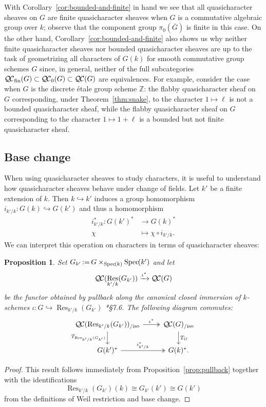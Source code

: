 \documentclass{amsart}
\theoremstyle{plain}
\newtheorem{proposition}[theorem]{Proposition}
\theoremstyle{definition}
\theoremstyle{remark}
\newcommand{\ZZ}{{\mathbb{Z}}}
\newcommand{\Fq}{k}
\DeclareMathOperator{\Res}{Res}
\newcommand{\Spec}[1]{{\operatorname{Spec}\hskip-1pt( #1 )}}
\newcommand{\ceq}{{\, :=\, }}
\newcommand{\QC}{{\mathcal{Q\hskip-0.8pt C}}}
\newcommand{\bQC}{{\QC_0}}
\newcommand{\fQC}{{\QC_\text{fin}}}
\newcommand{\QCiso}[1]{\QC(#1)_{/\text{iso}}}
\newcommand{\TrFrob}[1]{T_{#1}}
\begin{document}
With Corollary~\ref{cor:bounded-and-finite} in hand
we see that all quasicharacter sheaves on $G$ are finite quasicharacter sheaves
when $G$ is a commutative algebraic group over $\Fq$;
observe that the component group $\pi_0({\bar G})$ is finite in this case.
On the other hand, Corollary~\ref{cor:bounded-and-finite} also shows us
why neither finite quasicharacter sheaves nor bounded quasicharacter sheaves
are up to the task of geometrizing all characters of $G(\Fq)$ for smooth commutative group schemes $G$ since, in general, neither of the full subcategories
$\fQC(G) \subset \bQC(G) \subset \QC(G)$ are equivalences.
For example, consider the case when $G$ is the discrete \'etale group scheme $\ZZ$:
the flabby quasicharacter sheaf on $G$ corresponding, under Theorem~\ref{thm:snake},
to the character $1 \mapsto \ell$ is not a bounded quasicharacter sheaf,
while the flabby quasicharacter sheaf on $G$ corresponding
to the character $1 \mapsto 1+ \ell$ is a bounded but not finite quasicharacter sheaf.

\subsection{Base change}\label{sec:basechange}

When using quasicharacter sheaves to study characters, it is useful to understand
how quasicharacter sheaves behave under change of fields.
Let $k'$ be a finite extension of $k$. Then $k \hookrightarrow k'$ induces a group homomorphism
$i_{k'/k} : G(k) \hookrightarrow G(k')$ and thus a homomorphism
\begin{align*}
i_{k'/k}^* : G(k')^* &\to G(k)^* \\
\chi &\mapsto \chi\circ i_{k'/k}.
\end{align*}
We can interpret this operation on characters in terms of quasicharacter sheaves:

\begin{proposition} \label{prop:csbe}
Set $G_{k'} \ceq G\times_\Spec{k} \Spec{k'}$ and let
\[
\QC(\Res_{k'/k}(G_{k'})) \xrightarrow{\iota^*} \QC(G)
\]
be the functor obtained by pullback along the canonical closed immersion of $k$-schemes
$\iota : G \hookrightarrow \Res_{k'/k}(G_{k'})$
\cite{bosch-lutkebohmert-reynaud:NeronModels}*{\S 7.6}.
The following diagram commutes:
\[
\begin{tikzcd}
\QCiso{\Res_{k'/k}(G_{k'})} \arrow[two heads]{r}{\iota^*} \dar[swap]{\TrFrob{\Res_{k'/k}(G_{k'})}} & \QCiso{G} \dar{\TrFrob{G}} \\
G(k')^* \arrow[two heads]{r}{i_{k'/k}^*} & G(k)^*.
\end{tikzcd}
\]
\end{proposition}
\begin{proof}
This result follows immediately from Proposition~\ref{prop:pullback} together with the identifications
\[
\Res_{k'/k}(G_{k'})(k) \cong G_{k'}(k') \cong G(k')
\]
from the definitions of Weil restriction and base change.
\end{proof}
\end{document}
